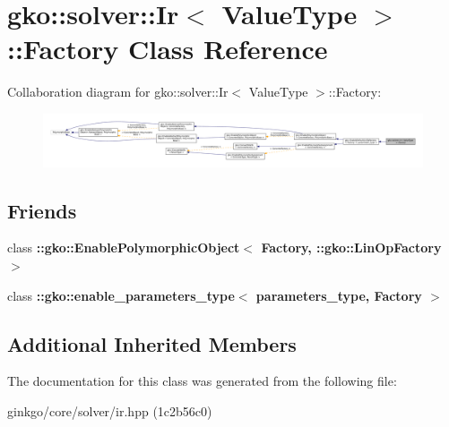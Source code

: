 \hypertarget{classgko_1_1solver_1_1Ir_1_1Factory}{}\section{gko\+:\+:solver\+:\+:Ir$<$ Value\+Type $>$\+:\+:Factory Class Reference}
\label{classgko_1_1solver_1_1Ir_1_1Factory}


Collaboration diagram for gko\+:\+:solver\+:\+:Ir$<$ Value\+Type $>$\+:\+:Factory\+:
\nopagebreak
\begin{figure}[H]
\begin{center}
\leavevmode
\includegraphics[width=350pt]{classgko_1_1solver_1_1Ir_1_1Factory__coll__graph}
\end{center}
\end{figure}
\subsection*{Friends}
\begin{DoxyCompactItemize}
\item 
\mbox{\label{classgko_1_1solver_1_1Ir_1_1Factory_a27e9bbc94a1c1c59f40833153eda8f78}} 
class {\bfseries \+::gko\+::\+Enable\+Polymorphic\+Object$<$ Factory, \+::gko\+::\+Lin\+Op\+Factory $>$}
\item 
\mbox{\label{classgko_1_1solver_1_1Ir_1_1Factory_a0d176cbd42d6214e11aee8c30ca256fc}} 
class {\bfseries \+::gko\+::enable\+\_\+parameters\+\_\+type$<$ parameters\+\_\+type, Factory $>$}
\end{DoxyCompactItemize}
\subsection*{Additional Inherited Members}


The documentation for this class was generated from the following file\+:\begin{DoxyCompactItemize}
\item 
ginkgo/core/solver/ir.\+hpp (1c2b56c0)\end{DoxyCompactItemize}
